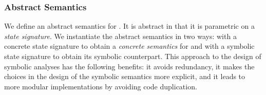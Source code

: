 %

\subsubsection{Abstract Semantics}
We define an abstract semantics for \jsil. It is abstract in that it is parametric on a \jsil \emph{state signature}. 
We instantiate the abstract semantics in two ways: with a concrete state signature to 
obtain a \emph{concrete semantics} for \jsil  and with a symbolic state signature to obtain its symbolic counterpart.
This approach to the design of symbolic analyses has the following benefits:  it avoids redundancy,
 it makes the choices in the design of the symbolic semantics more explicit, 
and  it leads to more modular implementations by avoiding code duplication.  


